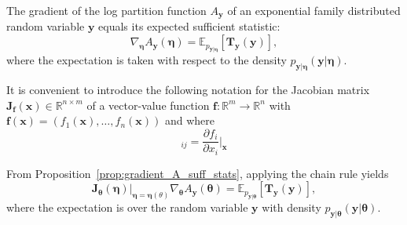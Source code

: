 \begin{proposition}\label{prop:gradient_A_suff_stats}
The gradient of the log partition function $A_{\mathbf{y}}$ of an exponential family distributed random variable $\mathbf{y}$ equals its expected sufficient statistic:
\begin{equation*}
\nabla_{\boldsymbol{\eta}} A_{\mathbf{y}}(\boldsymbol{\eta}) = \mathbb{E}_{p_{\mathbf{y} \vert \boldsymbol{\eta}}} \left[ \mathbf{T}_{\mathbf{y}}(\mathbf{y}) \right],
\end{equation*}
where the expectation is taken with respect to the density $p_{\mathbf{y} \vert \boldsymbol{\eta}}(\mathbf{y} \vert \boldsymbol{\eta})$. 
\end{proposition}
It is convenient to introduce the following notation for the Jacobian matrix $\mathbf{J}_{\mathbf{f}}(\mathbf{x}) \in \mathbb{R}^{n \times m}$ of a vector-value function $\mathbf{f}:\mathbb{R}^{m}\to\mathbb{R}^{n}$ with $\mathbf{f}(\mathbf{x}) = (f_{1}(\mathbf{x}),\ldots,f_{n}(\mathbf{x}))$ and where
\begin{equation*}
[\mathbf{J}_{\mathbf{f}}(\mathbf{x})]_{ij} = \frac{\partial f_{i}}{\partial x_{i}}\Big\vert_{\mathbf{x}}
\end{equation*}
\begin{corollary} \label{corollary:derivative_log_partition_function}
From Proposition~\ref{prop:gradient_A_suff_stats}, applying the chain rule yields
\begin{equation*}
 \mathbf{J}_{\boldsymbol{\theta}}(\boldsymbol{\eta})\Big|_{\boldsymbol{\eta} = \boldsymbol{\eta}(\theta)} \nabla_{\boldsymbol{\theta}} A_{\mathbf{y}}(\boldsymbol{\theta}) =  \mathbb{E}_{p_{\mathbf{y} \vert \boldsymbol{\theta}}} \left[ \mathbf{T}_{\mathbf{y}}(\mathbf{y}) \right],
\end{equation*}
where the expectation is over the random variable $\mathbf{y}$ with density $p_{\mathbf{y} \vert \boldsymbol{\theta}}(\mathbf{y} \vert \boldsymbol{\theta})$. 
\end{corollary}


